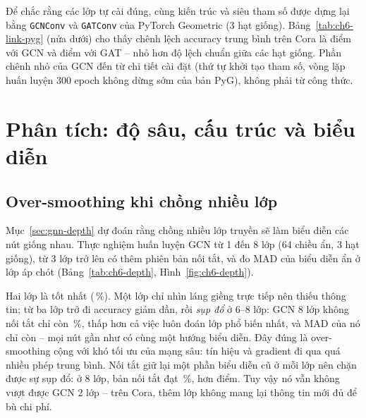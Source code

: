 Để chắc rằng các lớp tự cài đúng, cùng kiến trúc và siêu tham số được dựng lại bằng \texttt{GCNConv} và \texttt{GATConv}
của PyTorch Geometric (3 hạt giống). Bảng~\ref{tab:ch6-link-pyg} (nửa dưới) cho thấy chênh lệch accuracy trung bình trên
Cora là  điểm với GCN và  điểm với GAT -- nhỏ hơn độ lệch
chuẩn giữa các hạt giống. Phần chênh nhỏ của GCN đến từ chi tiết cài đặt (thứ tự khởi tạo tham số, vòng lặp huấn luyện 300
epoch không dừng sớm của bản PyG), không phải từ công thức.


\section{Phân tích: độ sâu, cấu trúc và biểu diễn}
\label{sec:gnn-analysis}

\subsection{Over-smoothing khi chồng nhiều lớp}

Mục~\ref{sec:gnn-depth} dự đoán rằng chồng nhiều lớp truyền sẽ làm biểu diễn các nút giống nhau. Thực nghiệm huấn luyện
GCN từ 1 đến 8 lớp (64 chiều ẩn, 3 hạt giống), từ 3 lớp trở lên có thêm phiên bản nối tắt, và đo MAD của biểu diễn ẩn ở
lớp áp chót (Bảng~\ref{tab:ch6-depth}, Hình~\ref{fig:ch6-depth}).


Hai lớp là tốt nhất (\,\%). Một lớp chỉ nhìn láng giềng trực tiếp nên thiếu thông tin;
từ ba lớp trở đi accuracy giảm dần, rồi \emph{sụp đổ} ở 6--8 lớp: GCN 8 lớp không nối tắt chỉ còn
\,\%, thấp hơn cả việc luôn đoán lớp phổ biến nhất, và MAD của nó chỉ còn  --
mọi nút gần như có cùng một hướng biểu diễn. Đây đúng là over-smoothing cộng với khó tối ưu của mạng sâu: tín hiệu và
gradient đi qua quá nhiều phép trung bình. Nối tắt giữ lại một phần biểu diễn cũ ở mỗi lớp nên chặn được sự sụp đổ:
ở 8 lớp, bản nối tắt đạt \,\%, hơn  điểm. Tuy vậy
nó vẫn không vượt được GCN 2 lớp -- trên Cora, thêm lớp không mang lại thông tin mới đủ để bù chi phí.

